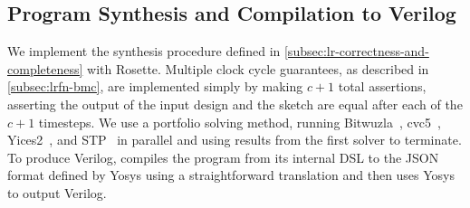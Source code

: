 

\subsection{Program Synthesis and Compilation to Verilog}
\label{sec:implementation:program-synthesis}

We implement
  the synthesis procedure
  defined in \cref{subsec:lr-correctness-and-completeness}
  with Rosette.
Multiple clock cycle guarantees,
  as described in \cref{subsec:lrfn-bmc},
  are implemented simply by making $c+1$
  total assertions,
  asserting the output of the input design
  and the sketch are equal
  after each of the $c+1$ timesteps.
We use a portfolio solving
  method, running
  Bitwuzla~\cite{niemetz2020bitwuzla},
  cvc5~\cite{barbosa2022cvc5},
  Yices2~\cite{dutertre2006yices,dutertre2014yices},
  and STP~\cite{stp}
  in parallel
  and using results from the first
  solver to terminate.
To produce Verilog,
  \lr compiles the program from its internal DSL
  to the JSON format defined
  by Yosys using a straightforward translation 
  and then uses Yosys to output Verilog.



